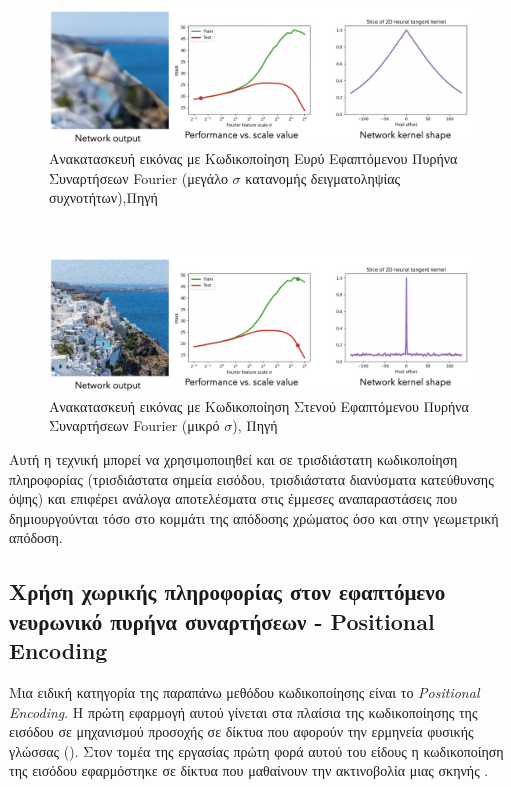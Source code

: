     \begin{figure}[ht]
        \centering
        \includegraphics[width = .8\linewidth]{images/chapter2_img/WideTangentKernel.jpg}
        \caption{Ανακατασκευή εικόνας με Κωδικοποίηση Ευρύ Εφαπτόμενου Πυρήνα Συναρτήσεων Fourier (μεγάλο $\sigma$ κατανομής δειγματοληψίας συχνοτήτων),Πηγή \cite{tancik2020fourier}}
        \label{fig:wideNTK}
    \end{figure} \\
    \begin{figure}[H]
        \centering
        \includegraphics[width = .8\linewidth]{images/chapter2_img/NarrowTangentKernel.jpg}
        \caption{Ανακατασκευή εικόνας με Κωδικοποίηση Στενού Εφαπτόμενου Πυρήνα Συναρτήσεων Fourier (μικρό $\sigma$), Πηγή \cite{tancik2020fourier}}
        \label{fig:narrowNTK}
    \end{figure}
    Αυτή η τεχνική μπορεί να χρησιμοποιηθεί και σε τρισδιάστατη κωδικοποίηση πληροφορίας (τρισδιάστατα σημεία εισόδου, τρισδιάστατα διανύσματα κατεύθυνσης όψης) και επιφέρει ανάλογα αποτελέσματα στις έμμεσες αναπαραστάσεις που δημιουργούνται τόσο στο κομμάτι της απόδοσης χρώματος όσο και στην γεωμετρική απόδοση. 
    
\subsection{Χρήση χωρικής πληροφορίας στον εφαπτόμενο νευρωνικό πυρήνα συναρτήσεων - Positional Encoding}
\par 
    Μια ειδική κατηγορία της παραπάνω μεθόδου κωδικοποίησης είναι το \textit{Positional Encoding}. Η πρώτη εφαρμογή αυτού γίνεται στα πλαίσια της κωδικοποίησης της εισόδου σε μηχανισμού προσοχής σε δίκτυα που αφορούν την ερμηνεία φυσικής γλώσσας ().  Στον τομέα της εργασίας πρώτη φορά αυτού του είδους η κωδικοποίηση της εισόδου εφαρμόστηκε σε δίκτυα που μαθαίνουν την ακτινοβολία μιας σκηνής  \cite{tancik2020fourier}.

